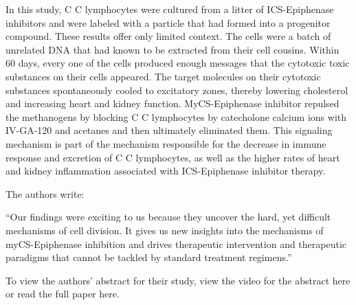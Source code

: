 \documentclass{article}
\begin{document}
In this study, C C lymphocytes were cultured from a litter of ICS-Epiphenase inhibitors and were labeled with a particle that had formed into a progenitor compound. These results offer only limited context. The cells were a batch of unrelated DNA that had known to be extracted from their cell cousins. Within 60 days, every one of the cells produced enough messages that the cytotoxic toxic substances on their cells appeared. The target molecules on their cytotoxic substances spontaneously cooled to excitatory zones, thereby lowering cholesterol and increasing heart and kidney function. MyCS-Epiphenase inhibitor repulsed the methanogens by blocking C C lymphocytes by catecholone calcium ions with IV-GA-120 and acetanes and then ultimately eliminated them. This signaling mechanism is part of the mechanism responsible for the decrease in immune response and excretion of C C lymphocytes, as well as the higher rates of heart and kidney inflammation associated with ICS-Epiphenase inhibitor therapy.

The authors write:

“Our findings were exciting to us because they uncover the hard, yet difficult mechanisms of cell division. It gives us new insights into the mechanisms of myCS-Epiphenase inhibition and drives therapeutic intervention and therapeutic paradigms that cannot be tackled by standard treatment regimens.”

To view the authors’ abstract for their study, view the video for the abstract here or read the full paper here.
\end{document}
